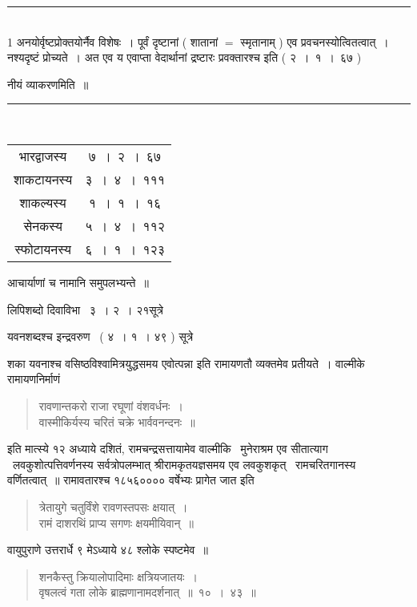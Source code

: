 \documentclass[11pt, openany]{book}
\begin{document}
\begin{multicols}{2}
\noindent
\rule{1\linewidth}{0.5pt}\\

1 अनयोर्वृष्टप्रोक्तयोर्नैव विशेषः~। पूर्वं दृष्टानां ( शातानां $=$ स्मृतानाम् ) एव प्रवचनस्योत्वितत्वात्~। नश्यदृष्टं प्रोच्यते~। अत एव {\qt य एवाप्ता वेदार्थानां द्रष्टारः प्रवक्तारश्च} इति ( २~।~१~।~६७ ) 

\columnbreak

\noindent
नीयं व्याकरणमिति~॥\\

\noindent
\rule{1\linewidth}{0.5pt}\\

\begin{center}
\begin{tabular}{c c}
भारद्वाजस्य & ७~।~२~।~६७\\
शाकटायनस्य & ३~।~४~।~१११\\
शाकल्यस्य & १~।~१~।~१६\\
सेनकस्य & ५~।~४~।~११२\\
स्फोटायनस्य & ६~।~१~।~१२३
\end{tabular}
\end{center}

आचार्याणां च नामानि समुपलभ्यन्ते~॥

लिपिशब्दो {\qt दिवाविभा \textendash\ ३~। २~। २१सूत्रे} 

यवनशब्दश्च इन्द्रवरुण \textendash\ ( ४~। १~। ४९ ) सूत्रे 

शका यवनाश्च वसिष्ठविश्वामित्रयुद्धसमय एवोत्पन्ना इति रामायणतौ व्यक्तमेव प्रतीयते~। वाल्मीके रामायणनिर्माणं

\begin{quote}
{\qt रावणान्तकरो राजा रघूणां वंशवर्धनः~।\\
वास्मीकिर्यस्य चरितं चक्रे भार्ववनन्दनः~॥}
\end{quote}

इति मात्स्ये १२ अध्याये दशितं, रामचन्द्रसत्तायामेव वाल्मीकि \textendash\ मुनेराश्रम एव सीतात्याग \textendash\ लवकुशोत्पत्तिवर्णनस्य सर्वत्रोपलम्भात् श्रीरामकृतयज्ञसमय एव लवकुशकृत् \textendash\ रामचरितगानस्य वर्णितत्वात्~॥ रामावतारश्च १८५६०००० वर्षेभ्यः प्रागेत जात इति

\begin{quote}
{\qt त्रेतायुगे चतुर्विंशे रावणस्तपसः क्षयात्~।\\
रामं दाशरथिं प्राप्य सगणः क्षयमीयिवान्~॥}
\end{quote}

वायुपुराणे उत्तरार्धे ९ मेऽध्याये ४८ श्लोके स्पष्टमेव~॥

\begin{quote}
{\qt शनकैस्तु क्रियालोपादिमाः क्षत्रियजातयः~।\\
वृषलत्वं गता लोके ब्राह्मणानामदर्शनात्~॥~१०~।~४३~॥

}
\end{quote}
\end{multicols}
\end{document}
